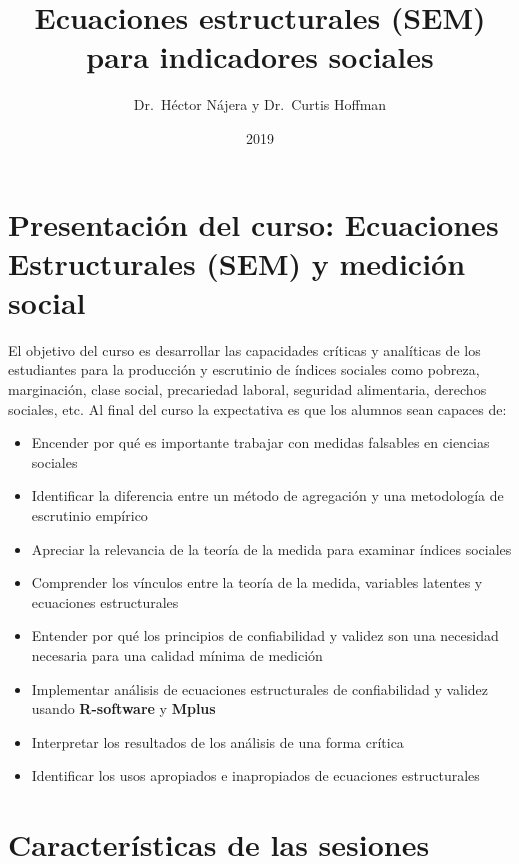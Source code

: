 \documentclass[11pt,]{article}
\title{Ecuaciones estructurales (SEM) para indicadores sociales}
\author{Dr.~Héctor Nájera y Dr.~Curtis Hoffman}
\date{2019}
\providecommand{\tightlist}{%
  \setlength{\itemsep}{0pt}\setlength{\parskip}{0pt}}
\begin{document}
\maketitle

{
\setcounter{tocdepth}{2}
\tableofcontents
}
\newpage

\hypertarget{presentacion-del-curso-ecuaciones-estructurales-sem-y-medicion-social}{%
\section{Presentación del curso: Ecuaciones Estructurales (SEM) y
medición
social}\label{presentacion-del-curso-ecuaciones-estructurales-sem-y-medicion-social}}

El objetivo del curso es desarrollar las capacidades críticas y
analíticas de los estudiantes para la producción y escrutinio de índices
sociales como pobreza, marginación, clase social, precariedad laboral,
seguridad alimentaria, derechos sociales, etc. Al final del curso la
expectativa es que los alumnos sean capaces de:

\begin{itemize}
\tightlist
\item
  Encender por qué es importante trabajar con medidas falsables en
  ciencias sociales
\item
  Identificar la diferencia entre un método de agregación y una
  metodología de escrutinio empírico
\item
  Apreciar la relevancia de la teoría de la medida para examinar índices
  sociales
\item
  Comprender los vínculos entre la teoría de la medida, variables
  latentes y ecuaciones estructurales
\item
  Entender por qué los principios de confiabilidad y validez son una
  necesidad necesaria para una calidad mínima de medición
\item
  Implementar análisis de ecuaciones estructurales de confiabilidad y
  validez usando \textbf{R-software} y \textbf{Mplus}
\item
  Interpretar los resultados de los análisis de una forma crítica
\item
  Identificar los usos apropiados e inapropiados de ecuaciones
  estructurales
\end{itemize}

\hypertarget{caracteristicas-de-las-sesiones}{%
\section{Características de las
sesiones}\label{caracteristicas-de-las-sesiones}}
\end{document}
